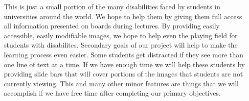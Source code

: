 \documentclass{article}
\begin{document}
This is just a small portion of the many disabilities faced by students in universities around the world. We hope to help them by giving them full access all information presented on boards during lectures. By providing easily accessible, easily modifiable images, we hope to help even the playing field for students with disabilites.
Secondary goals of our project will help to make the learning process even easier. Some students get distracted if they see more than one line of text at a time. If we have enough time we will help these students by providing slide bars that will cover portions of the images that students are not currently viewing. This and many other minor features are things that we will accomplish if we have free time after completing our primary objectives.
\end{document}
